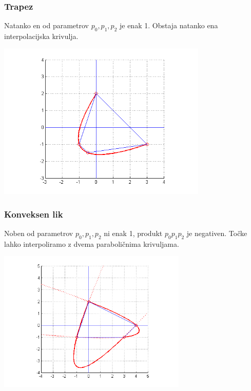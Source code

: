 \documentclass{beamer}
\newcommand{\al}{\alpha}
\begin{document}
\begin{frame}

\frametitle{Trapez}

Natanko en od parametrov $p_0, p_1, p_2$ je enak 1. 
Obstaja natanko ena interpolacijska krivulja.


\includegraphics[width=10cm]{trap}


\end{frame}


\begin{frame}

\frametitle{Konveksen lik}

Noben od parametrov $p_0, p_1, p_2$ ni enak 1, produkt $p_0 p_1 p_2$ je negativen. Točke lahko interpoliramo z dvema paraboličnima krivuljama.

\includegraphics[width=9cm]{konv}

\end{frame}
\end{document}

